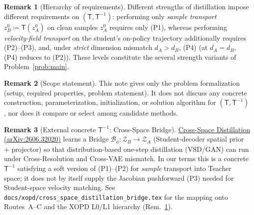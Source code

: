 \documentclass[11pt,a4paper]{article}
\newcommand{\Za}{\mathcal{Z}_{A}}
\newcommand{\Zb}{\mathcal{Z}_{B}}
\newcommand{\Tmap}{\mathsf{T}}
\newcommand{\Tinv}{\mathsf{T}^{-1}}
\theoremstyle{definition}
\newtheorem{remark}{Remark}
\begin{document}
\begin{remark}[Hierarchy of requirements]
\label{rem:layering}
Different strengths of distillation impose different requirements on $(\Tmap,\Tinv)$: performing
only \emph{sample transport} $z_B^{0}\coloneqq\Tmap(z_A^{0})$ on clean samples $z_A^{0}$ requires only
(P1), whereas performing \emph{velocity-field transport} on the student's on-policy trajectory
additionally requires (P2)--(P3), and, under \emph{strict} dimension mismatch $d_A>d_B$, (P4)
(at $d_A=d_B$, (P4) reduces to (P2)). These levels constitute the several strength variants of
Problem~\ref{prob:main}.
\end{remark}

\begin{remark}[Scope statement]
This note gives only the problem formalization (setup, required properties, problem statement). It
does not discuss any concrete construction, parameterization, initialization, or solution algorithm
for $(\Tmap,\Tinv)$, nor does it compare or select among candidate methods.
\end{remark}

\begin{remark}[External concrete $\Tinv$: Cross-Space Bridge]
\label{rem:bridge}
\href{https://arxiv.org/abs/2606.32020}{Cross-Space Distillation (arXiv:2606.32020)} learns a
Bridge $\mathcal{B}_\phi:\Zb\to\Za$ (Student-decoder spatial prior $+$ projector) so that
distribution-based one-step distillation (VSD/GAN) can run under Cross-Resolution and Cross-VAE
mismatch. In our terms this is a concrete $\Tinv$ satisfying a soft version of (P1)--(P2) for
\emph{sample} transport into Teacher space; it does not by itself supply the Jacobian pushforward
(P3) needed for Student-space velocity matching. See
\texttt{docs/xopd/cross\_space\_distillation\_bridge.tex} for the mapping onto Routes~A--C and
the XOPD L0/L1 hierarchy (Rem.~\ref{rem:layering}).
\end{remark}
\end{document}
